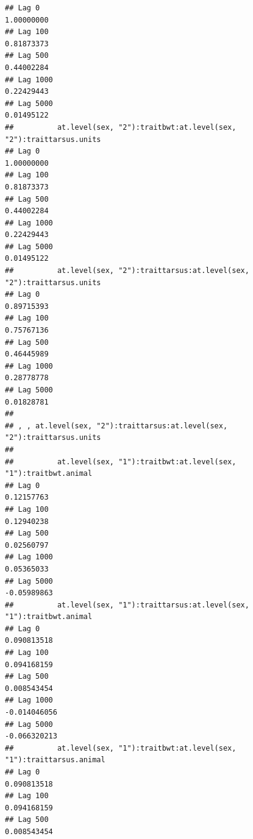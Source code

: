 \documentclass[
  12pt,
]{book}
\begin{document}
\begin{verbatim}
## Lag 0                                                          1.00000000
## Lag 100                                                        0.81873373
## Lag 500                                                        0.44002284
## Lag 1000                                                       0.22429443
## Lag 5000                                                       0.01495122
##          at.level(sex, "2"):traitbwt:at.level(sex, "2"):traittarsus.units
## Lag 0                                                          1.00000000
## Lag 100                                                        0.81873373
## Lag 500                                                        0.44002284
## Lag 1000                                                       0.22429443
## Lag 5000                                                       0.01495122
##          at.level(sex, "2"):traittarsus:at.level(sex, "2"):traittarsus.units
## Lag 0                                                             0.89715393
## Lag 100                                                           0.75767136
## Lag 500                                                           0.46445989
## Lag 1000                                                          0.28778778
## Lag 5000                                                          0.01828781
## 
## , , at.level(sex, "2"):traittarsus:at.level(sex, "2"):traittarsus.units
## 
##          at.level(sex, "1"):traitbwt:at.level(sex, "1"):traitbwt.animal
## Lag 0                                                        0.12157763
## Lag 100                                                      0.12940238
## Lag 500                                                      0.02560797
## Lag 1000                                                     0.05365033
## Lag 5000                                                    -0.05989863
##          at.level(sex, "1"):traittarsus:at.level(sex, "1"):traitbwt.animal
## Lag 0                                                          0.090813518
## Lag 100                                                        0.094168159
## Lag 500                                                        0.008543454
## Lag 1000                                                      -0.014046056
## Lag 5000                                                      -0.066320213
##          at.level(sex, "1"):traitbwt:at.level(sex, "1"):traittarsus.animal
## Lag 0                                                          0.090813518
## Lag 100                                                        0.094168159
## Lag 500                                                        0.008543454

\end{verbatim}
\end{document}
